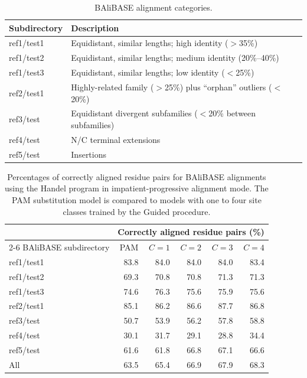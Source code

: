 \documentclass[12pt]{article}
\begin{document}
\begin{table}[t]
\centering
\caption{BAliBASE alignment categories.}
\label{tab:balibase}
\begin{tabular}{ll}
\toprule
Subdirectory & Description \\
\midrule
ref1/test1 & Equidistant, similar lengths; high identity ($>$35\%) \\
ref1/test2 & Equidistant, similar lengths; medium identity (20\%--40\%) \\
ref1/test3 & Equidistant, similar lengths; low identity ($<$25\%) \\
ref2/test1 & Highly-related family ($>$25\%) plus ``orphan'' outliers ($<$20\%) \\
ref3/test  & Equidistant divergent subfamilies ($<$20\% between subfamilies) \\
ref4/test  & N/C terminal extensions \\
ref5/test  & Insertions \\
\bottomrule
\end{tabular}
\end{table}


\begin{table}[t]
\centering
\caption{Percentages of correctly aligned residue pairs for BAliBASE alignments using the Handel program in impatient-progressive alignment mode. The PAM substitution model is compared to models with one to four site classes trained by the Guided procedure.}
\label{tab:impatient}
\begin{tabular}{lrrrrr}
\toprule
& \multicolumn{5}{c}{Correctly aligned residue pairs (\%)} \\
\cmidrule(l){2-6}
BAliBASE subdirectory & PAM & $C=1$ & $C=2$ & $C=3$ & $C=4$ \\
\midrule
ref1/test1 & 83.8 & 84.0 & 84.0 & 84.0 & 83.4 \\
ref1/test2 & 69.3 & 70.8 & 70.8 & 71.3 & 71.3 \\
ref1/test3 & 74.6 & 76.3 & 75.6 & 75.9 & 75.6 \\
ref2/test1 & 85.1 & 86.2 & 86.6 & 87.7 & 86.8 \\
ref3/test  & 50.7 & 53.9 & 56.2 & 57.8 & 58.8 \\
ref4/test  & 30.1 & 31.7 & 29.1 & 28.8 & 34.4 \\
ref5/test  & 61.6 & 61.8 & 66.8 & 67.1 & 66.6 \\
\midrule
All        & 63.5 & 65.4 & 66.9 & 67.9 & 68.3 \\
\bottomrule
\end{tabular}
\end{table}
\end{document}
